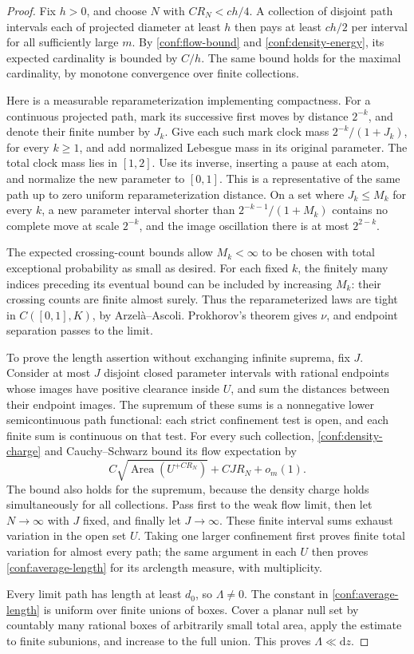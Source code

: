 \documentclass[11pt]{article}
\numberwithin{equation}{section}
\theoremstyle{definition}
\theoremstyle{remark}
\newcommand{\dd}{\mathrm d}
\newcommand{\1}{\mathbf 1}
\DeclareMathOperator{\Area}{Area}
\begin{document}
\begin{proof}
Fix \(h>0\), and choose \(N\) with \(CR_N<ch/4\).  A collection
of disjoint path intervals each of projected diameter at least \(h\)
then pays at least \(ch/2\) per interval for all sufficiently large
\(m\).  By \eqref{conf:flow-bound} and
\eqref{conf:density-energy}, its expected cardinality is bounded by
\(C/h\).  The same bound holds for the maximal cardinality, by
monotone convergence over finite collections.

Here is a measurable reparameterization implementing compactness.
For a continuous projected path, mark its successive first moves by
distance \(2^{-k}\), and denote their finite number by \(J_k\).
Give each such mark clock mass \(2^{-k}/(1+J_k)\), for every
\(k\ge1\), and add normalized Lebesgue mass in its original
parameter.  The total clock mass lies in \([1,2]\).  Use its inverse,
inserting a pause at each atom, and normalize the new parameter to
\([0,1]\).  This is a representative of the same path up to zero
uniform reparameterization distance.  On a set where \(J_k\le M_k\)
for every \(k\), a new parameter interval shorter than
\(2^{-k-1}/(1+M_k)\) contains no complete move at scale \(2^{-k}\),
and the image oscillation there is at most \(2^{2-k}\).

The expected crossing-count bounds allow \(M_k<\infty\) to be
chosen with total exceptional probability as small as desired.  For
each fixed \(k\), the finitely many indices preceding its eventual
bound can be included by increasing \(M_k\): their crossing counts
are finite almost surely.  Thus the reparameterized laws are tight
in \(C([0,1],K)\), by Arzel\`a--Ascoli.  Prokhorov's theorem gives
\(\nu\), and endpoint separation passes to the limit.

To prove the length assertion without exchanging infinite suprema,
fix \(J\).  Consider at most \(J\) disjoint closed parameter intervals
with rational endpoints whose images have positive clearance inside
\(U\), and sum the distances between their endpoint images.  The
supremum of these sums is a nonnegative lower semicontinuous path
functional: each strict confinement test is open, and each finite sum
is continuous on that test.  For every such collection,
\eqref{conf:density-charge} and Cauchy--Schwarz bound its flow
expectation by
\[
 C\sqrt{\Area(U^{+CR_N})}+CJR_N+o_m(1).
\]
The bound also holds for the supremum, because the density charge
holds simultaneously for all collections.  Pass first to the weak
flow limit, then let \(N\to\infty\) with \(J\) fixed, and finally
let \(J\to\infty\).  These finite interval sums exhaust variation
in the open set \(U\).  Taking one larger confinement first proves
finite total variation for almost every path; the same argument in
each \(U\) then proves \eqref{conf:average-length} for its arclength
measure, with multiplicity.

Every limit path has length at least \(d_0\), so \(\Lambda\ne0\).
The constant in \eqref{conf:average-length} is uniform over finite
unions of boxes.  Cover a planar null set by countably many rational
boxes of arbitrarily small total area, apply the estimate to finite
subunions, and increase to the full union.  This proves
\(\Lambda\ll\dd z\).
\end{proof}
\end{document}
